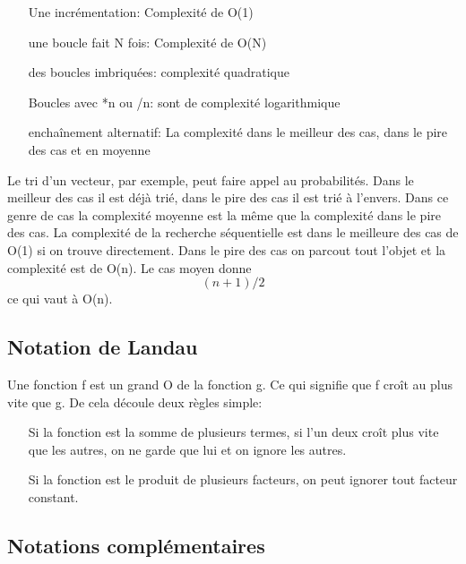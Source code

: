 \documentclass{article}
\begin{document}
\begin{itemize}
	\item[Une incrémentation:]Complexité de O(1)
	\item[une boucle fait N fois:] Complexité de O(N)
    	\item[des boucles imbriquées:] complexité quadratique 
	\item[Boucles avec *n ou /n:] sont de complexité logarithmique
	\item[enchaînement alternatif:] La complexité dans le meilleur des cas, dans le pire des cas et en moyenne
\end{itemize}
\bigskip
Le tri d'un vecteur, par exemple, peut faire appel au probabilités. Dans le meilleur des cas il est déjà trié, dans le pire des cas il est trié à l'envers. Dans ce genre de cas la complexité moyenne est la même que la complexité dans le pire des cas. 
La complexité de la recherche séquentielle est dans le meilleure des cas de O(1) si on trouve directement. Dans le pire des cas on parcout tout l'objet et la complexité est de O(n). Le cas moyen donne $$ (n+1)/2 $$ ce qui vaut à O(n). 

\subsection{Notation de Landau}
Une fonction f est un grand O de la fonction g. Ce qui signifie que f croît au plus vite que g. De cela découle deux règles simple:
\begin{itemize}
	\item[Si la fonction est la somme de plusieurs termes, si l'un deux croît plus vite que les autres, on ne garde que lui et on ignore les autres.]
	\item[Si la fonction est le produit de plusieurs facteurs, on peut ignorer tout facteur constant.]
\end{itemize}
\subsection{Notations complémentaires}
\end{document}
